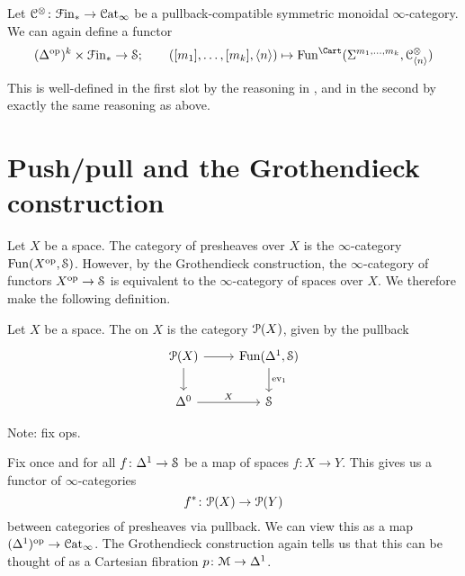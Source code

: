 \documentclass[main.tex]{subfiles}
\begin{document}
Let $\category{C}^{\otimes}\colon \Finp \to \ICat$ be a pullback-compatible symmetric monoidal $\infty$-category. We can again define a functor
\begin{equation*}
  (\D\op)^{k} \times \Finp \to \S;\qquad ([m_{1}], \ldots, [m_{k}], \langle n \rangle) \mapsto \Fun^{\Cart}(\Sig^{m_{1}, \ldots, m_{k}}, \category{C}^{\otimes}_{\langle n \rangle})
\end{equation*}

This is well-defined in the first slot by the reasoning in \cite[Cor.~5.12]{1409.0837}, and in the second by exactly the same reasoning as above.

\section{Push/pull and the Grothendieck construction}
\label{sec:push_pull_and_the_grothendieck_construction}

Let $X$ be a space. The category of presheaves over $X$ is the $\infty$-category $\Fun(X\op,  \S)$. However, by the Grothendieck construction, the $\infty$-category of functors $X\op \to \S$ is equivalent to the $\infty$-category of spaces over $X$. We therefore make the following definition.

\begin{definition}
  \label{def:category_of_presheaves}
  Let $X$ be a space. The  on $X$ is the category $\P(X)$, given by the pullback
  \begin{equation*}
    \begin{tikzcd}
      \P(X)
      \arrow[r]
      \arrow[d]
      & \Fun(\Delta^{1}, \S)
      \arrow[d, "\ev_{1}"]
      \\
      \Delta^{0}
      \arrow[r, "X"]
      & \S
    \end{tikzcd}
  \end{equation*}
\end{definition}

Note: fix ops.

Fix once and for all $f\colon \Delta^{1} \to \S$ be a map of spaces $f\colon X \to Y$. This gives us a functor of $\infty$-categories
\begin{equation*}
  f^{*}\colon \P(X) \to \P(Y)
\end{equation*}
between categories of presheaves via pullback. We can view this as a map $(\Delta^{1})\op \to \ICat$. The Grothendieck construction again tells us that this can be thought of as a Cartesian fibration $p\colon \category{M} \to \Delta^{1}$.
\end{document}
